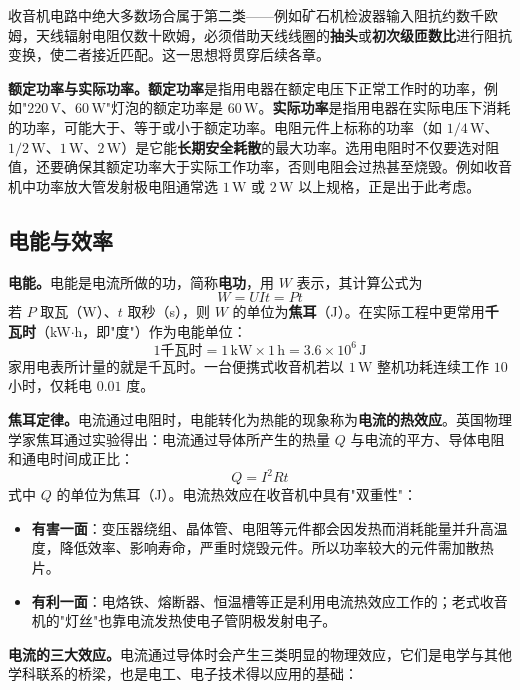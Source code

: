 \documentclass[12pt,UTF8]{ctexbook}
\begin{document}
收音机电路中绝大多数场合属于第二类——例如矿石机检波器输入阻抗约数千欧姆，天线辐射电阻仅数十欧姆，必须借助天线线圈的\textbf{抽头}或\textbf{初次级匝数比}进行阻抗变换，使二者接近匹配。这一思想将贯穿后续各章。

\textbf{额定功率与实际功率。}\textbf{额定功率}是指用电器在额定电压下正常工作时的功率，例如"$220\,\mathrm{V}$、$60\,\mathrm{W}$"灯泡的额定功率是 $60\,\mathrm{W}$。\textbf{实际功率}是指用电器在实际电压下消耗的功率，可能大于、等于或小于额定功率。电阻元件上标称的功率（如 $1/4\,\mathrm{W}$、$1/2\,\mathrm{W}$、$1\,\mathrm{W}$、$2\,\mathrm{W}$）是它能\textbf{长期安全耗散}的最大功率。选用电阻时不仅要选对阻值，还要确保其额定功率大于实际工作功率，否则电阻会过热甚至烧毁。例如收音机中功率放大管发射极电阻通常选 $1\,\mathrm{W}$ 或 $2\,\mathrm{W}$ 以上规格，正是出于此考虑。

\subsection{电能与效率}

\textbf{电能。}电能是电流所做的功，简称\textbf{电功}，用 $W$ 表示，其计算公式为
\[
W = U I t = P t
\]
若 $P$ 取瓦（W）、$t$ 取秒（s），则 $W$ 的单位为\textbf{焦耳}（J）。在实际工程中更常用\textbf{千瓦时}（kW$\cdot$h，即"度"）作为电能单位：
\[
1 \text{千瓦时} = 1\,\mathrm{kW} \times 1\,\mathrm{h} = 3.6 \times 10^6\,\mathrm{J}
\]
家用电表所计量的就是千瓦时。一台便携式收音机若以 $1\,\mathrm{W}$ 整机功耗连续工作 $10$ 小时，仅耗电 $0.01$ 度。

\textbf{焦耳定律。}电流通过电阻时，电能转化为热能的现象称为\textbf{电流的热效应}。英国物理学家焦耳通过实验得出：电流通过导体所产生的热量 $Q$ 与电流的平方、导体电阻和通电时间成正比：
\[
Q = I^2 R t
\]
式中 $Q$ 的单位为焦耳（J）。电流热效应在收音机中具有"双重性"：
\begin{itemize}
  \item \textbf{有害一面}：变压器绕组、晶体管、电阻等元件都会因发热而消耗能量并升高温度，降低效率、影响寿命，严重时烧毁元件。所以功率较大的元件需加散热片。
  \item \textbf{有利一面}：电烙铁、熔断器、恒温槽等正是利用电流热效应工作的；老式收音机的"灯丝"也靠电流发热使电子管阴极发射电子。
\end{itemize}

\textbf{电流的三大效应。}电流通过导体时会产生三类明显的物理效应，它们是电学与其他学科联系的桥梁，也是电工、电子技术得以应用的基础：
\end{document}
